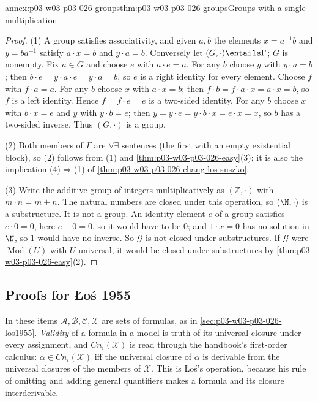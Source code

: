 \begin{annexitem}{annex:p03-w03-p03-026-groups}{thm:p03-w03-p03-026-groups}{Groups with a single multiplication}
\begin{proof}
(1) A group satisfies associativity, and given \(a,b\) the elements
\(x=a^{-1}b\) and \(y=ba^{-1}\) satisfy \(a\cdot x=b\) and \(y\cdot a=b\).
Conversely let \((G,\cdot)\entails\Gamma\); \(G\) is nonempty.  Fix
\(a\in G\) and choose \(e\) with \(a\cdot e=a\).  For any \(b\) choose \(y\)
with \(y\cdot a=b\); then \(b\cdot e=y\cdot a\cdot e=y\cdot a=b\), so \(e\)
is a right identity for every element.  Choose \(f\) with \(f\cdot a=a\).
For any \(b\) choose \(x\) with \(a\cdot x=b\); then
\(f\cdot b=f\cdot a\cdot x=a\cdot x=b\), so \(f\) is a left identity.
Hence \(f=f\cdot e=e\) is a two-sided identity.  For any \(b\) choose \(x\)
with \(b\cdot x=e\) and \(y\) with \(y\cdot b=e\); then
\(y=y\cdot e=y\cdot b\cdot x=e\cdot x=x\), so \(b\) has a two-sided inverse.
Thus \((G,\cdot)\) is a group.

(2) Both members of \(\Gamma\) are \(\forall\exists\) sentences (the first
with an empty existential block), so (2) follows from (1) and
\cref{thm:p03-w03-p03-026-easy}(3); it is also the implication
(4)\(\Rightarrow\)(1) of \cref{thm:p03-w03-p03-026-chang-los-suszko}.

(3) Write the additive group of integers multiplicatively as
\((\mathbb Z,\cdot)\) with \(m\cdot n=m+n\).  The natural numbers are closed
under this operation, so \((\N,\cdot)\) is a substructure.  It is not a group.
An identity element \(e\) of a group satisfies \(e\cdot0=0\), here \(e+0=0\),
so it would have to be \(0\); and \(1\cdot x=0\) has no solution in \(\N\), so
\(1\) would have no inverse.  So
\(\mathcal G\) is not closed under substructures.  If \(\mathcal G\) were
\(\operatorname{Mod}(U)\) with \(U\) universal, it would be closed under
substructures by \cref{thm:p03-w03-p03-026-easy}(2).
\end{proof}
\end{annexitem}

\subsection{Proofs for \L o\'s 1955}
\label{sec:annex-p03-w03-p03-026-los1955}

In these items \(\mathcal A,\mathcal B,\mathcal C,\mathcal X\) are sets of
formulas, as in \cref{sec:p03-w03-p03-026-los1955}.  \emph{Validity} of a
formula in a model is truth of its universal closure under every assignment,
and \(\mathit{Cn}_i(\mathcal X)\) is read through the handbook's first-order
calculus: \(\alpha\in\mathit{Cn}_i(\mathcal X)\) iff the universal closure of
\(\alpha\) is derivable from the universal closures of the members of
\(\mathcal X\).  This is \L o\'s's operation, because his rule of omitting and
adding general quantifiers makes a formula and its closure interderivable.

